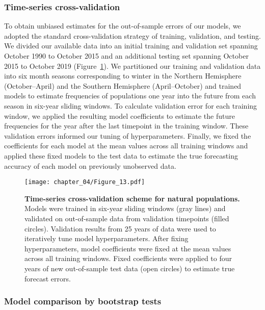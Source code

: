 \subsubsection{Time-series cross-validation}

To obtain unbiased estimates for the out-of-sample errors of our models, we adopted the standard cross-validation strategy of training, validation, and testing.
We divided our available data into an initial training and validation set spanning October 1990 to October 2015 and an additional testing set spanning October 2015 to October 2019 (Figure~\ref{fig:cross_validation_for_natural_populations}).
We partitioned our training and validation data into six month seasons corresponding to winter in the Northern Hemisphere (October--April) and the Southern Hemisphere (April--October) and trained models to estimate frequencies of populations one year into the future from each season in six-year sliding windows.
To calculate validation error for each training window, we applied the resulting model coefficients to estimate the future frequencies for the year after the last timepoint in the training window.
These validation errors informed our tuning of hyperparameters.
Finally, we fixed the coefficients for each model at the mean values across all training windows and applied these fixed models to the test data to estimate the true forecasting accuracy of each model on previously unobserved data.

\begin{figure}
  \begin{center}
  \texttt{[image: chapter\_04/Figure\_13.pdf]}
  \caption[{Time-series cross-validation scheme for natural populations.}]{
  {\bf Time-series cross-validation scheme for natural populations.}
  Models were trained in six-year sliding windows (gray lines) and validated on out-of-sample data from validation timepoints (filled circles).
  Validation results from 25 years of data were used to iteratively tune model hyperparameters.
  After fixing hyperparameters, model coefficients were fixed at the mean values across all training windows.
  Fixed coefficients were applied to four years of new out-of-sample test data (open circles) to estimate true forecast errors.
  }
  \label{fig:cross_validation_for_natural_populations}
  \end{center}
\end{figure}

\subsubsection{Model comparison by bootstrap tests}

